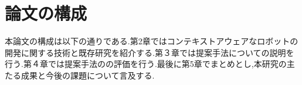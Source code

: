 \section{論文の構成}
本論文の構成は以下の通りである.第2章ではコンテキストアウェアなロボットの開発に関する技術と既存研究を紹介する.第３章では提案手法についての説明を行う.第４章では提案手法のの評価を行う.最後に第5章でまとめとし,本研究の主たる成果と今後の課題について言及する.






